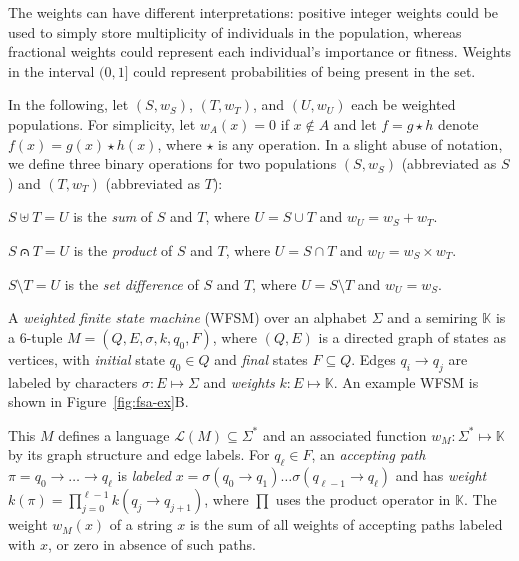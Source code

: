 \documentclass{llncs}
\begin{document}
The weights can have different interpretations:
positive integer weights could be used to simply store multiplicity of individuals in the population,
whereas fractional weights could represent each individual's importance or fitness.
Weights in the interval $(0,1]$ could represent probabilities of being present in the set.%

In the following, let $(S, w_S)$, $(T, w_T)$, and $(U, w_U)$ each be weighted populations.
For simplicity, let $w_A(x)=0$ if $x \notin A$ and let $f = g \star h$ denote $f(x) = g(x) \star h(x)$, where $\star$ is any operation.
In a slight abuse of notation, we define three binary operations for two populations $(S, w_S)$ (abbreviated as $S$) and
$(T, w_T)$ (abbreviated as $T$):

$S \uplus T = U$ is the \emph{sum} of $S$ and $T$, where $U = S \cup T$ and $w_U = w_S + w_T$.

$S \capdot T = U$ is the \emph{product} of $S$ and $T$, where $U = S \cap T$ and $w_U = w_S \times w_T$.

$S \setminus T = U$ is the \emph{set difference} of $S$ and $T$, where $U = S \setminus T$ and $w_U = w_S$.




A \emph{weighted finite state machine} (WFSM) over an alphabet $\Sigma$ and a semiring $\mathbb{K}$ is a 6-tuple $M = (Q, E, \sigma, k, q_0, F)$,
where $(Q,E)$ is a directed graph of states as vertices,
with \emph{initial} state $q_0 \in Q$ and \emph{final} states $F \subseteq Q$.
Edges $q_i \to q_j$ are labeled by characters $\sigma : E \mapsto \Sigma$ and \emph{weights} $k : E \mapsto \mathbb{K}$.
An example WFSM is shown in Figure~\ref{fig:fsa-ex}B.

This $M$ defines a language $\mathcal{L}(M) \subseteq \Sigma^*$ and an associated function $w_M : \Sigma^* \mapsto \mathbb{K}$ by its graph structure and edge labels.
For $q_\ell \in F$,
an \emph{accepting path} $\pi = q_0 \to \ldots \to q_\ell$ is
\emph{labeled} $x = \sigma(q_0 \to q_1) \ldots \sigma(q_{\ell-1} \to q_\ell)$
and has \emph{weight} $k(\pi)=\prod_{j=0}^{\ell-1} k( q_j \to q_{j+1} )$,
where $\prod$ uses the product operator in $\mathbb{K}$.
The weight $w_M(x)$ of a string $x$ is the sum of all weights of accepting paths labeled with $x$, or zero in absence of such paths.
\end{document}
